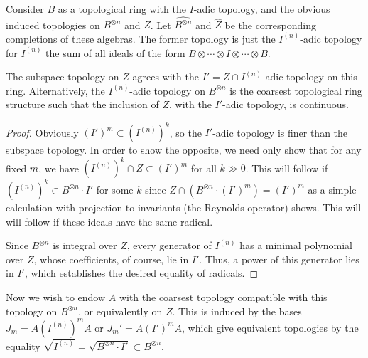 \documentclass[ALCO,ThmDefs,Unicode,epreuves]{cedram}
\begin{document}
Consider $B$ as a
topological ring with the $I$-adic topology, and the obvious induced
topologies on $B^{\otimes n}$ and $Z$. Let $\widehat{B^{\otimes n}}$
and $\widehat{Z}$ be the corresponding completions of these algebras.
The former topology is just
the $I^{(n)}$-adic topology for $I^{(n)}$ the sum of all ideals of the
form $B\otimes \cdots \otimes I\otimes \cdots \otimes B$.
\begin{lemma}
 The subspace topology on $Z$ agrees with the 
 $I'=Z\cap I^{(n)}$-adic topology on this ring. Alternatively, the
 $I^{(n)}$-adic topology on $B^{\otimes n}$ is the coarsest
 topological ring structure
 such that the inclusion of $Z$, with the $I'$-adic topology, is continuous.
\end{lemma}
\begin{proof}
 Obviously $ (I')^m\subset (I^{(n)})^k$, so the $I'$-adic topology is
 finer than the subspace topology. In order to show the opposite, we need only show that for any fixed $m$, we have
 $(I^{(n)})^k\cap Z\subset (I')^m$ for all $k\gg 0$. This will
 follow if $(I^{(n)})^k\subset B^{\otimes n}\cdot I'$ for some $k$
 since $Z\cap(B^{\otimes n}\cdot (I')^m)=(I')^m$ as a simple
 calculation with projection to invariants (\ie the Reynolds
 operator) shows. This will
 will follow if these ideals have the same radical.

 Since $B^{\otimes n}$ is integral over $Z$, every generator of $
 I^{(n)}$ has a minimal polynomial over $Z$, whose coefficients, of
 course, lie in $I'$. Thus, a power of this generator lies in $I'$,
 which establishes the desired equality of radicals. 
\end{proof}
 Now we wish to endow $A$ with the coarsest topology compatible with
 this topology on $B^{\otimes n}$, or equivalently on $Z$. This is induced by the bases $J_m=A (I^{(n)})^m
 A$ or $J_m'=A (I')^mA$, which give equivalent topologies by the
 equality $\sqrt{I^{(n)}}=\sqrt{B^{\otimes n}\cdot I'}\subset
 B^{\otimes n}$.
\end{document}
